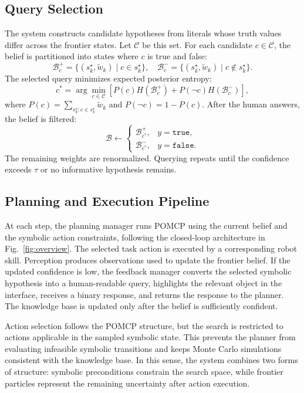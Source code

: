 \subsection{Query Selection}

The system constructs candidate hypotheses from literals whose truth values differ across the frontier states. Let $\mathcal{C}$ be this set. For each candidate $c\in \mathcal{C}$, the belief is partitioned into states where $c$ is true and false:
\[
\mathcal{B}^{+}_{c}=\{(s_k^\star,\tilde{w}_k)\mid c\in s_k^\star\}, \quad
\mathcal{B}^{-}_{c}=\{(s_k^\star,\tilde{w}_k)\mid c\notin s_k^\star\}.
\]
The selected query minimizes expected posterior entropy:
\begin{equation}
c^*=\arg\min_{c\in \mathcal{C}}
\left[
P(c)H(\mathcal{B}^{+}_{c})+
P(\neg c)H(\mathcal{B}^{-}_{c})
\right],
\label{eq:query_selection}
\end{equation}
where $P(c)=\sum_{s_k^\star:c\in s_k^\star}\tilde{w}_k$ and $P(\neg c)=1-P(c)$. After the human answers, the belief is filtered:
\begin{equation}
\mathcal{B}\leftarrow
\begin{cases}
\mathcal{B}^{+}_{c^*}, & y=\texttt{true},\\
\mathcal{B}^{-}_{c^*}, & y=\texttt{false}.
\end{cases}
\label{eq:filter}
\end{equation}
The remaining weights are renormalized. Querying repeats until the confidence exceeds $\tau$ or no informative hypothesis remains.

\subsection{Planning and Execution Pipeline}

At each step, the planning manager runs POMCP using the current belief and the symbolic action constraints, following the closed-loop architecture in Fig.~\ref{fig:overview}. The selected task action is executed by a corresponding robot skill. Perception produces observations used to update the frontier belief. If the updated confidence is low, the feedback manager converts the selected symbolic hypothesis into a human-readable query, highlights the relevant object in the interface, receives a binary response, and returns the response to the planner. The knowledge base is updated only after the belief is sufficiently confident.

Action selection follows the POMCP structure, but the search is restricted to actions applicable in the sampled symbolic state. This prevents the planner from evaluating infeasible symbolic transitions and keeps Monte Carlo simulations consistent with the knowledge base. In this sense, the system combines two forms of structure: symbolic preconditions constrain the search space, while frontier particles represent the remaining uncertainty after action execution.

